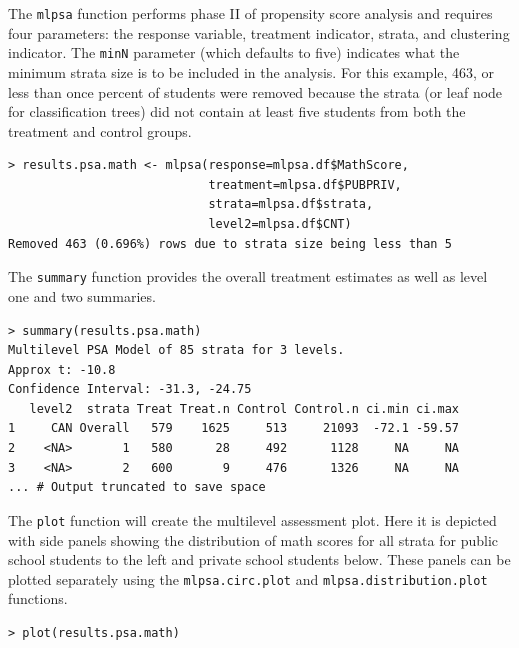 \documentclass[letterpaper,12p,twoside]{article} %
\begin{document}
\clearpage

The \texttt{mlpsa} function performs phase II of propensity score analysis and requires four parameters: the response variable, treatment indicator, strata, and clustering indicator. The \texttt{minN} parameter (which defaults to five) indicates what the minimum strata size is to be included in the analysis. For this example, 463, or less than once percent of students were removed because the strata (or leaf node for classification trees) did not contain at least five students from both the treatment and control groups.

\begin{verbatim}
> results.psa.math <- mlpsa(response=mlpsa.df$MathScore, 
                            treatment=mlpsa.df$PUBPRIV, 
                            strata=mlpsa.df$strata, 
                            level2=mlpsa.df$CNT)
Removed 463 (0.696%) rows due to strata size being less than 5
\end{verbatim}

\noindent The \texttt{summary} function provides the overall treatment estimates as well as level one and two summaries.

\begin{verbatim}
> summary(results.psa.math)
Multilevel PSA Model of 85 strata for 3 levels.
Approx t: -10.8
Confidence Interval: -31.3, -24.75
   level2  strata Treat Treat.n Control Control.n ci.min ci.max
1     CAN Overall   579    1625     513     21093  -72.1 -59.57
2    <NA>       1   580      28     492      1128     NA     NA
3    <NA>       2   600       9     476      1326     NA     NA
... # Output truncated to save space
\end{verbatim}

The \texttt{plot} function will create the multilevel assessment plot. Here it is depicted with side panels showing the distribution of math scores for all strata for public school students to the left and private school students below. These panels can be plotted separately using the \texttt{mlpsa.circ.plot} and \texttt{mlpsa.distribution.plot} functions.

\begin{verbatim}
> plot(results.psa.math)
\end{verbatim}
\end{document}
